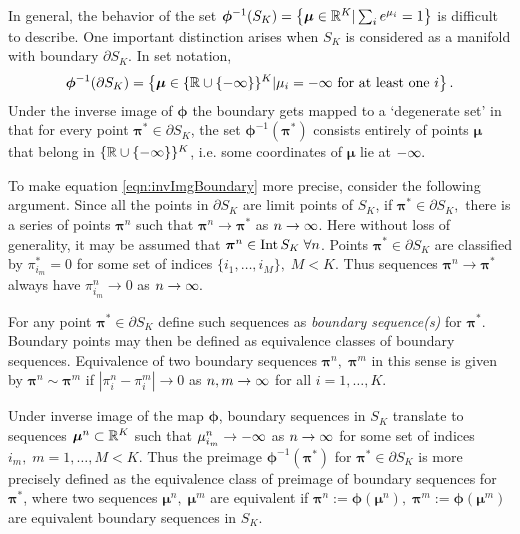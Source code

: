 \documentclass[12pt,letterpaper]{amsbook}
\begin{document}
	In general, the behavior of the set \( \bm\phi^{-1}(S_K) = \left\{\bm\mu\in\mathbb R^K|\sum_i e^{\mu_i} = 1\right\} \) is difficult to describe. One important distinction arises when \( S_K \) is considered as a manifold with boundary \( \partial S_K \).  In set notation,
	\begin{equation}\label{eqn:invImgBoundary}
	\bm\phi^{-1}(\partial S_K) = \left\{\bm\mu\in \{\mathbb R\cup \{-\infty\}\}^K | \mu_i=-\infty \text{ for at least one } i\right\}.
	\end{equation}
	Under the inverse image of \( \bm\phi \) the boundary gets mapped to a `degenerate set' in that for every point \( \bm\pi^{\ast}\in\partial S_K \), the set \( \bm\phi^{-1}(\bm\pi^{\ast}) \) consists entirely of points \( \bm\mu \) that belong in \( \{\mathbb R\cup \{-\infty\}\}^K \), i.e. some coordinates of \( \bm\mu \) lie at \( -\infty. \)
	
	To make equation \eqref{eqn:invImgBoundary} more precise, consider the following argument. Since all the points in \( \partial S_K \) are limit points of \( S_K \), if \( \bm\pi^{\ast}\in\partial S_K, \) there is a series of points \( \bm\pi^n \) such that \( \bm\pi^n\rightarrow\bm\pi^{\ast} \) as \( n\rightarrow\infty \).  Here without loss of generality, it may be assumed that \( \bm\pi^n\in\operatorname{Int}S_K\;\forall n \).  Points \( \bm\pi^{\ast}\in\partial S_K \) are classified by \( \pi^{\ast}_{i_m} = 0 \) for some set of indices \( \{i_1,\ldots,i_M\},\;M<K \). Thus sequences \( \bm\pi^n\rightarrow\bm\pi^{\ast} \) always have \( \pi^{n}_{i_m}\rightarrow 0 \) as \( n\rightarrow\infty. \) 
	
	For any point \( \bm\pi^{\ast}\in\partial S_K \) define such sequences as \textit{boundary sequence(s)} for \( \bm\pi^{\ast} \). Boundary points may then be defined as equivalence classes of boundary sequences. Equivalence of two boundary sequences \( \bm\pi^n,\;\bm\pi^m \) in this sense is given by \( \bm\pi^n\sim\bm\pi^m \) if \( |\pi^n_i -\pi^m_i|\rightarrow 0 \) as \( n,m\rightarrow\infty \) for all \( i=1,\ldots,K. \)
	
	Under inverse image of the map \( \bm\phi \), boundary sequences in \( S_K \) translate to sequences \( \bm\mu^{n}\subset\mathbb R^K\) such that \( \mu^n_{i_m} \rightarrow -\infty\) as \( n\rightarrow\infty \) for some set of indices \( i_m,\;m=1,\ldots,M<K \). Thus the preimage \( \bm\phi^{-1}(\bm\pi^{\ast}) \) for \( \bm\pi^{\ast}\in \partial S_K \) is more precisely defined as the equivalence class of preimage of boundary sequences for \( \bm\pi^{\ast}\! \), where two sequences \( \bm\mu^n\!,\;\bm\mu^m \) are equivalent if \( \bm\pi^n:=\bm\phi(\bm\mu^n),\;\bm\pi^m:=\bm\phi(\bm\mu^m)\) are equivalent boundary sequences in \( S_K \).
	
\end{document}

